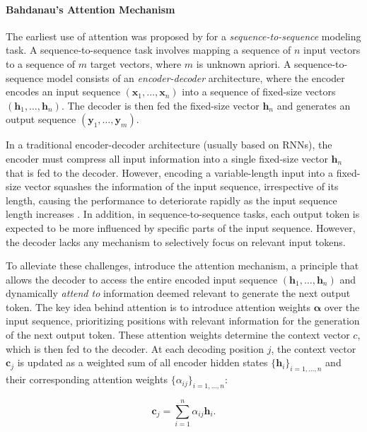 \paragraph{Bahdanau's Attention Mechanism} The earliest use of attention was proposed by \citet{bahdanau2014neural} for a \textit{sequence-to-sequence} modeling task. A sequence-to-sequence task involves mapping a sequence of $n$ input vectors to a sequence of $m$ target vectors, where $m$ is unknown apriori. A sequence-to-sequence model \citep{sutskever2014sequence} consists of an \textit{encoder-decoder} architecture, where the encoder encodes an input sequence $(\bm{x}_1, \ldots, \bm{x}_n)$ into a sequence of fixed-size vectors $(\bm{h}_1, \ldots, \bm{h}_n)$. The decoder is then fed the fixed-size vector $\bm{h}_n$ and generates an output sequence $(\bm{y}_1, \ldots, \bm{y}_m)$.

In a traditional encoder-decoder architecture (usually based on \acp{RNN}), the encoder must compress all input information into a single fixed-size vector $\bm{h}_n$ that is fed to the decoder. However, encoding a variable-length input into a fixed-size vector squashes the information of the input sequence, irrespective of its length, causing the performance to deteriorate rapidly as the input sequence length increases \citep{cho2014properties}. In addition, in sequence-to-sequence tasks, each output token is expected to be more influenced by specific parts of the input sequence. However, the decoder lacks any mechanism to selectively focus on relevant input tokens.

To alleviate these challenges, \citet{bahdanau2014neural} introduce the attention mechanism, a principle that allows the decoder to access the entire encoded input sequence $(\bm{h}_1, \ldots, \bm{h}_n)$ and dynamically \textit{attend to} information deemed relevant to generate the next output token. The key idea behind attention is to introduce attention weights $\bm{\alpha}$ over the input sequence, prioritizing positions with relevant information for the generation of the next output token. These attention weights determine the context vector $c$, which is then fed to the decoder. At each decoding position $j$, the context vector $\bm{c}_j$ is updated as a weighted sum of all encoder hidden states $\{\bm{h}_i\}_{i=1, \ldots, n}$ and their corresponding attention weights $\{\alpha_{ij}\}_{i=1, \ldots, n}$: 

\begin{equation}
    \bm{c}_j = \sum_{i=1}^n \alpha_{ij} \bm{h}_i.
\end{equation}

